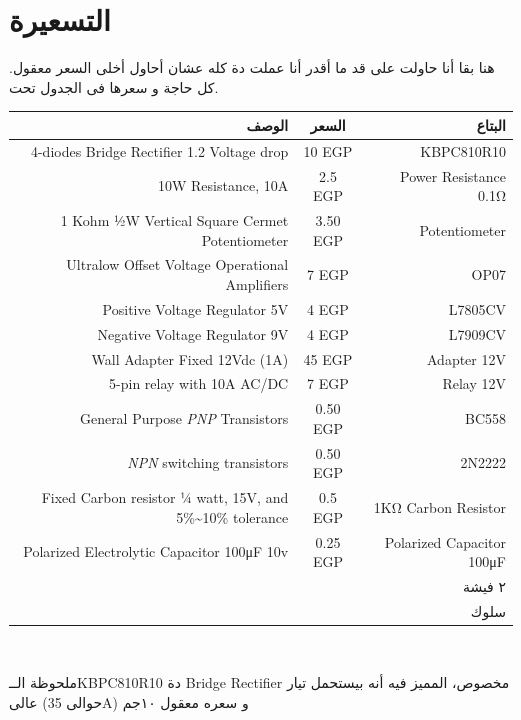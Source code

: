 \documentclass{article}
\begin{document}
\section{التسعيرة}
هنا بقا أنا حاولت على قد ما أقدر أنا عملت دة كله عشان أحاول أخلى السعر معقول. كل حاجة و سعرها فى الجدول تحت.

\begin{english} \begin{tabular}{|r|c|r|}
    \hline 
      \textarabic{الوصف}
    & \textarabic{السعر}
    & \textarabic{البتاع}
    \\ \hline 
    4-diodes Bridge Rectifier 1.2 Voltage drop & 10 EGP & KBPC810R10
    \\
    10W Resistance, 10A & 2.5 EGP & Power Resistance 0.1Ω 
    \\
    1 Kohm ½W Vertical Square Cermet Potentiometer & 3.50 EGP & Potentiometer
    \\
    Ultralow Offset Voltage Operational Amplifiers & 7 EGP & OP07
    \\
    Positive Voltage Regulator 5V & 4 EGP & L7805CV
    \\
    Negative Voltage Regulator 9V & 4 EGP & L7909CV 
    \\
    Wall Adapter Fixed 12Vdc (1A) & 45 EGP & Adapter 12V
    \\
    5-pin relay with 10A AC/DC & 7 EGP & Relay 12V
    \\
    General Purpose \textit{PNP} Transistors & 0.50 EGP & BC558
    \\
    \textit{NPN} switching transistors & 0.50 EGP& 2N2222
    \\
    Fixed Carbon resistor ¼ watt, 15V, and 5\%\~{}10\% tolerance & 0.5 EGP & 1KΩ Carbon Resistor
    \\
    Polarized Electrolytic Capacitor 100μF 10v & 0.25 EGP & Polarized Capacitor 100μF
    \\
    & & \textarabic{٢ فيشة}
    \\
    & & \textarabic{سلوك}
    \\
    \hline
\end{tabular} \end{english}
\\ \vspace{12pt} 

\noindent *ملحوظة الــ\textenglish{KBPC810R10} دة \textenglish{Bridge Rectifier} مخصوص، 
المميز فيه أنه بيستحمل تيار عالى (حوالى \textenglish{35A}) و سعره معقول ١٠جم
\end{document}
